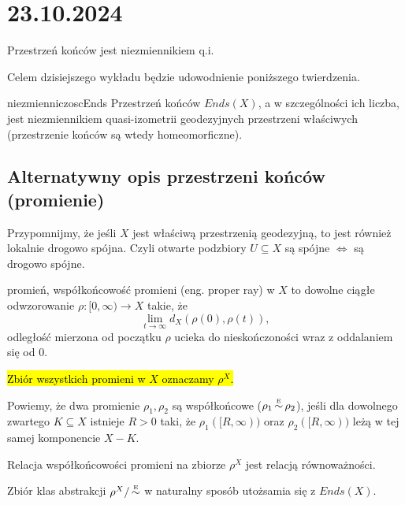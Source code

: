 \section{23.10.2024}{Przestrzeń końców jest niezmiennikiem q.i.}

Celem dzisiejszego wykładu będzie udowodnienie poniższego twierdzenia.

\begin{theorem}{}{niezmienniczoscEnds} 
  Przestrzeń końców $Ends(X)$, a w szczególności ich liczba, jest niezmiennikiem quasi-izometrii geodezyjnych przestrzeni właściwych (przestrzenie końców są wtedy homeomorficzne). %
\end{theorem}

\subsection{Alternatywny opis przestrzeni końców (promienie)}

Przypomnijmy, że jeśli $X$ jest właściwą przestrzenią geodezyjną, to jest również lokalnie drogowo spójna. Czyli otwarte podzbiory $U\subseteq X$ są spójne $\iff$ są drogowo spójne.

\begin{definition}{promień, współkońcowość promieni}{}
   (eng. proper ray) w $X$ to dowolne ciągłe odwzorowanie $\rho:[0,\infty)\to X$ takie, że 
  $$\lim_{t\to\infty}d_X(\rho(0), \rho(t)),$$
  odległość mierzona od początku $\rho$ ucieka do nieskończoności wraz z oddalaniem się od $0$.

  \hl{Zbiór wszystkich promieni w $X$ oznaczamy $\rho^X$.}

  Powiemy, że dwa promienie $\rho_1,\rho_2$ są współkońcowe ($\rho_1\operatorname{\overset{{\scriptscriptstyle E}}{\sim}}\rho_2$), jeśli dla dowolnego zwartego $K\subseteq X$ istnieje $R>0$ taki, że $\rho_1([R, \infty))$ oraz $\rho_2([R, \infty))$ leżą w tej samej komponencie $X-K$.
\end{definition}

Relacja współkońcowości promieni na zbiorze $\rho^X$ jest relacją równoważności.

\begin{fact}{}{}
  Zbiór klas abstrakcji $\rho^X/\operatorname{\overset{{\scriptscriptstyle E}}{\sim}}$ w naturalny sposób utożsamia się z $Ends(X)$.
\end{fact}

